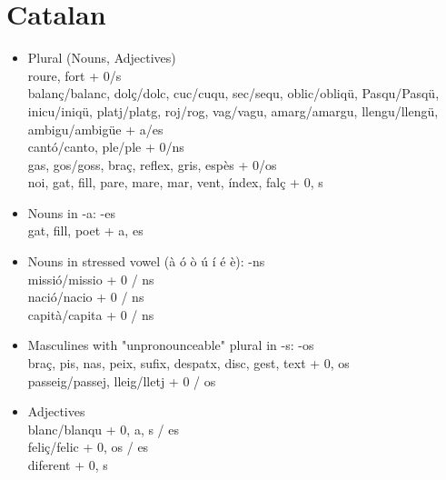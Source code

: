 \section{Catalan}
\begin{flushleft}
\begin{itemize}
\item Plural (Nouns, Adjectives) \\

roure, fort + 0/s\\

balanç/balanc, dolç/dolc, cuc/cuqu, sec/sequ, oblic/obliqü, Pasqu/Pasqü, inicu/iniqü, platj/platg, roj/rog, vag/vagu, amarg/amargu, llengu/llengü, ambigu/ambigüe + a/es\\

cantó/canto, ple/ple + 0/ns\\

gas, gos/goss, braç, reflex, gris, espès + 0/os\\

noi, gat, fill, pare, mare, mar, vent, índex, falç + 0, s\\

\item Nouns in -a: -es\\

gat, fill, poet + a, es\\

\item Nouns in stressed vowel (à ó ò ú í é è): -ns\\

missió/missio + 0 / ns\\
nació/nacio + 0 / ns\\
capità/capita + 0 / ns\\

\item Masculines with "unpronounceable" plural in -s: -os\\

braç, pis, nas, peix, sufix, despatx, disc, gest, text + 0, os\\

passeig/passej, lleig/lletj + 0 / os\\



\item  Adjectives\\

blanc/blanqu + 0, a, s / es\\
feliç/felic + 0, os / es\\
diferent + 0, s\\


\end{itemize}
\end{flushleft}

